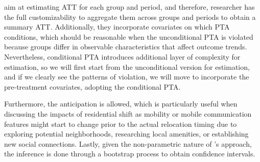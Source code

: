 \cite{callaway2021difference} aim at estimating ATT for each group and period, and therefore, researcher has the full customizability to aggregate them across groups and periods to obtain a summary ATT.
Additionally, they incorporate covariates on which PTA conditions, which should be reasonable when the unconditional PTA is violated because groups differ in observable characteristics that affect outcome trends.
Nevertheless, conditional PTA introduces additional layer of complexity for estimation, so we will first start from the unconditional version for estimation, and if we clearly see the patterns of violation, we will move to incorporate the pre-treatment covariates, adopting the conditional PTA.

Furthermore, the anticipation is allowed, which is particularly useful when discussing the impacts of residential shift as mobility or mobile communication features might start to change prior to the actual relocation timing due to exploring potential neighborhoods, researching local amenities, or establishing new social connections. Lastly, given the non-parametric nature of \cite{callaway2021difference}'s approach, the inference is done through a bootstrap process to obtain confidence intervals.

